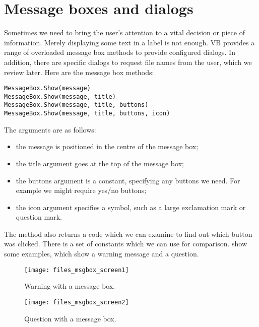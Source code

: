 	\section{Message boxes and dialogs}
		Sometimes we need to bring the user's attention to a vital decision or piece of information. Merely displaying some text in a label is not enough. VB provides a range of overloaded message box methods to provide configured dialogs. In addition, there are specific dialogs to request file names from the user, which we review later. Here are the message box methods:
		\begin{lstlisting}
MessageBox.Show(message)
MessageBox.Show(message, title)
MessageBox.Show(message, title, buttons)
MessageBox.Show(message, title, buttons, icon)
		\end{lstlisting}
		The arguments are as follows:
		\begin{itemize}
      \item the message is positioned in the centre of the message box;
      \item the title argument goes at the top of the message box;
      \item the buttons argument is a constant, specifying any buttons we need. For example we might require yes/no buttons;
      \item the icon argument specifies a symbol, such as a large exclamation mark or question mark.
		\end{itemize}
		The  method also returns a code which we can examine to find out which button was clicked. There is a set of  constants which we can use for comparison.  show some examples, which show a warning message and a question.
		\begin{figure}[bth]
			\centering
			\begin{minipage}[t]{.45\textwidth}
			  \centering
				\texttt{[image: files\_msgbox\_screen1]}
				\caption{Warning with a message box.}
				\label{fig:files_msgbox_screen1}
			\end{minipage}\hfill%
			\begin{minipage}[t]{.45\textwidth}
				\centering
				\texttt{[image: files\_msgbox\_screen2]}	
				\caption{Question with a message box.}
				\label{fig:files_msgbox_screen2}
			\end{minipage}
		\end{figure}
		
